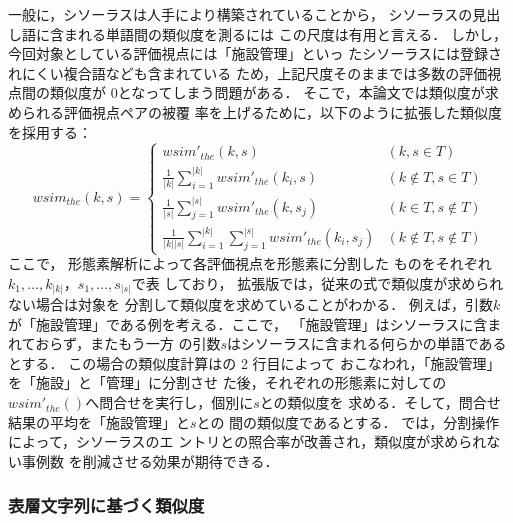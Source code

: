 \documentclass[japanese]{jnlp_1.4}
\def\eq#1{}
\begin{document}
一般に，シソーラスは人手により構築されていることから，
シソーラスの見出し語に含まれる単語間の類似度を測るには
この尺度は有用と言える．
しかし，今回対象としている評価視点には「施設管理」といっ
たシソーラスには登録されにくい複合語なども含まれている
ため，上記尺度そのままでは多数の評価視点間の類似度が
$0$となってしまう問題がある．
そこで，本論文では類似度が求められる評価視点ペアの被覆
率を上げるために，以下のように拡張した類似度を採用する：
\begin{equation}
\label{eq:thesaurus_k}
wsim_{the}(k, s)=
 \begin{cases}
  \mathit{wsim}'_\mathit{the}(k, s) & (k, s \in T) \\
  \frac{1}{|k|} \sum_{i=1}^{|k|} \mathit{wsim}'_\mathit{the}(k_i, s) & (k \notin T, s \in T) \\
  \frac{1}{|s|} \sum_{j=1}^{|s|} \mathit{wsim}'_\mathit{the}(k, s_j) & (k \in T, s \notin T) \\
  \frac{1}{|k||s|} \sum_{i=1}^{|k|}\sum_{j=1}^{|s|} \mathit{wsim}'_\mathit{the}(k_i, s_j) & (k \notin T, s \notin T)
 \end{cases}
\end{equation}
ここで， 形態素解析によって各評価視点を形態素に分割した
ものをそれぞれ$k_1,\ldots,k_{|k|}$，$s_1,\ldots,s_{|s|}$で表
しており，
拡張版では，従来の式で類似度が求められない場合は対象を
分割して類似度を求めていることがわかる．
例えば，引数$k$が「施設管理」である例を考える．ここで，
「施設管理」はシソーラスに含まれておらず，またもう一方
の引数$s$はシソーラスに含まれる何らかの単語であるとする．
この場合の類似度計算は\eq{thesaurus_k}の 2 行目によって
おこなわれ，「施設管理」を「施設」と「管理」に分割させ
た後，それぞれの形態素に対して\eq{thesaurus}の
$\mathit{wsim}'_\mathit{the}()$へ問合せを実行し，個別に$s$との類似度を
求める．そして，問合せ結果の平均を「施設管理」と$s$との
間の類似度であるとする．
\eq{thesaurus_k}では，分割操作によって，シソーラスのエ
ントリとの照合率が改善され，類似度が求められない事例数
を削減させる効果が期待できる．


\subsubsection{表層文字列に基づく類似度}
\end{document}
